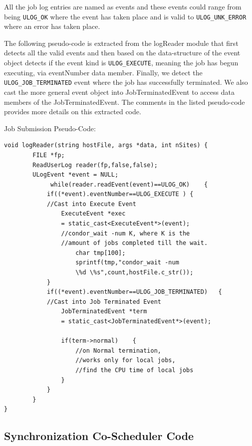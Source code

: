 \documentclass[ms,electronic,double]{nuthesis}
\begin{document}
All the job log entries are named as events and these events could range from being  \texttt{ULOG\_OK} where 
the event has taken place and is valid to \texttt{ULOG\_UNK\_ERROR} where an error has 
taken place.

The following pseudo-code is extracted from the logReader module that first 
detects all the valid events and then based on the data-structure of the event 
object detects if the event kind is \texttt{ULOG\_EXECUTE}, meaning the job has begun 
executing, via eventNumber data member. Finally, we detect the \texttt{ULOG\_JOB\_TERMINATED} 
event where the job has successfully terminated. We also cast the more general event 
object into JobTerminatedEvent to access data members of the 
JobTerminatedEvent. The comments in the listed pseudo-code provides more details 
on this extracted code.


Job Submission Pseudo-Code:

\begin{lstlisting}
void logReader(string hostFile, args *data, int nSites)	{		
		FILE *fp;
		ReadUserLog reader(fp,false,false);
		ULogEvent *event = NULL;		
             while(reader.readEvent(event)==ULOG_OK)	{                    
            if((*event).eventNumber==ULOG_EXECUTE )	{                                
            //Cast into Execute Event
                ExecuteEvent *exec 
                = static_cast<ExecuteEvent*>(event);                                       
                //condor_wait -num K, where K is the 
                //amount of jobs completed till the wait.
                    char tmp[100];
                    sprintf(tmp,"condor_wait -num 
                    \%d \%s",count,hostFile.c_str());
            }            
            if((*event).eventNumber==ULOG_JOB_TERMINATED)	{                
            //Cast into Job Terminated Event
                JobTerminatedEvent *term 
                = static_cast<JobTerminatedEvent*>(event);                
                
                if(term->normal)	{                    
                    //on Normal termination, 
                    //works only for local jobs, 
                    //find the CPU time of local jobs
                }               
            }
        }
}

\end{lstlisting}
\subsection{Synchronization Co-Scheduler Code}
\end{document}

